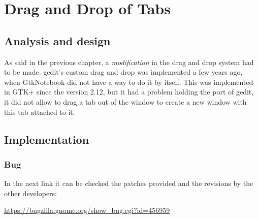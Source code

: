 
\chapter{Drag and Drop of Tabs}


\section{Analysis and design}

As said in the previous chapter, a \emph{modification} in the drag and drop system had to be made. gedit's custom drag and drop was implemented a few years ago, when GtkNotebook did not have a way to do it by itself. This was implemented in GTK+ since the version 2.12, but it had a problem holding the port of gedit, it did not allow to drag a tab out of the window to create a new window with this tab attached to it.

\section{Implementation}

\subsection{Bug}

In the next link it can be checked the patches provided and the revisions by the other developers:

\noindent\url{https://bugzilla.gnome.org/show_bug.cgi?id=456959}\label{Bug456959}
